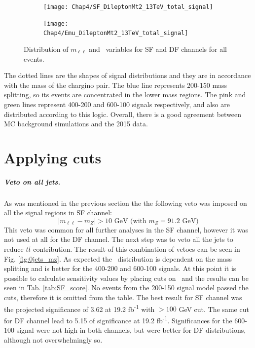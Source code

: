 \begin{figure}[!th]
\begin{subfigure}[t]{0.5\textwidth}
        \end{subfigure}
        \begin{subfigure}[t]{0.5\textwidth}
		\subcaption{} 
		\label{fig:SF_total_mt2}
        \texttt{[image: Chap4/SF\_DileptonMt2\_13TeV\_total\_signal]} 
        \end{subfigure} 
     \begin{subfigure}[t]{0.5\textwidth}
     \subcaption{}
     	\label{fig:DF_total_mt2}
        \texttt{[image: Chap4/Emu\_DileptonMt2\_13TeV\_total\_signal]} 
        \end{subfigure}
\caption{Distribution of $m_{\ell \ell}$ and \mttwo \, variables for SF and DF channels for all events.}	
        \label{fig:Elmu_total_histos}
\end{figure}

The dotted lines are the shapes of signal distributions and they are in accordance with the mass of the chargino pair. The blue line represents 200-150 mass splitting, so its events are concentrated in the lower mass regions. The pink and green lines represent 400-200 and 600-100 signals respectively, and also are distributed according to this logic. Overall, there is a good agreement between MC background simulations and the 2015 data. 

\newpage
\section{Applying cuts}
\subparagraph{Veto on all jets.}

As was mentioned in the previous section the the following veto was imposed on all the signal regions in SF channel:
\begin{equation*}
|m_{\ell \ell} - m_Z| > 10 \text{ GeV (with } m_Z = 91.2 \text{ GeV}) 
\end{equation*}
This veto was common for all further analyses in the SF channel, however it was not used at all for the DF channel.
The next step was to veto all the jets to reduce $t\bar{t}$ contribution. The result of this combination of vetoes can be seen in Fig. \ref{fig:0jets_mz}. As expected the \mttwo \, distribution is dependent on the mass splitting and is better for the 400-200 and 600-100 signals. At this point it is possible to calculate sensitivity values by placing cuts on \mttwo \, and the results can be seen in Tab. \ref{tab:SF_score}. No events from the 200-150 signal model passed the cuts, therefore it is omitted from the table. The best result for SF channel was the projected significance of 3.62 at 19.2 fb\textsuperscript{-1}  with \mttwo$>100$ GeV cut. The same cut for DF channel lead to 5.15 of significance at 19.2 fb\textsuperscript{-1}. Significances for the 600-100 signal were not high in both channels, but were better for DF distributions, although not overwhelmingly so. 

